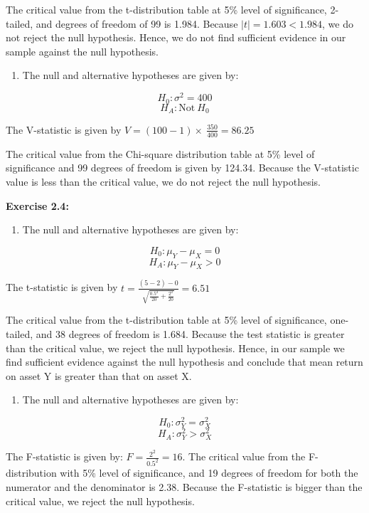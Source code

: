 \documentclass[
]{book}
\providecommand{\tightlist}{%
  \setlength{\itemsep}{0pt}\setlength{\parskip}{0pt}}
\theoremstyle{definition}
\theoremstyle{definition}
\theoremstyle{definition}
\theoremstyle{definition}
\theoremstyle{remark}
\begin{document}
The critical value from the t-distribution table at 5\% level of significance, 2-tailed, and degrees of freedom of 99 is 1.984. Because \(|t|=1.603<1.984\), we do not reject the null hypothesis. Hence, we do not find sufficient evidence in our sample against the null hypothesis.

\begin{enumerate}
\def\labelenumi{\alph{enumi}.}
\setcounter{enumi}{1}
\tightlist
\item
  The null and alternative hypotheses are given by:
\end{enumerate}

\[H_0: \sigma^2=400\]
\[H_A: \text{Not} \ H_0\]

The V-statistic is given by \(\displaystyle V= (100-1) \times \ \frac{350}{400}=86.25\)

The critical value from the Chi-square distribution table at 5\% level of significance and 99 degrees of freedom is given by 124.34. Because the V-statistic value is less than the critical value, we do not reject the null hypothesis.

\textbf{Exercise 2.4:}

\begin{enumerate}
\def\labelenumi{\alph{enumi}.}
\tightlist
\item
  The null and alternative hypotheses are given by:
\end{enumerate}

\[H_0: \mu_Y-\mu_X=0\]
\[H_A: \mu_Y-\mu_X>0\]

The t-statistic is given by \(\displaystyle t=\frac{(5-2)-0}{\sqrt{\frac{0.5^2}{20}+\frac{2^2}{20}}}=6.51\)

The critical value from the t-distribution table at 5\% level of significance, one-tailed, and 38 degrees of freedom is 1.684. Because the test statistic is greater than the critical value, we reject the null hypothesis. Hence, in our sample we find sufficient evidence against the null hypothesis and conclude that mean return on asset Y is greater than that on asset X.

\begin{enumerate}
\def\labelenumi{\alph{enumi}.}
\setcounter{enumi}{1}
\tightlist
\item
  The null and alternative hypotheses are given by:
\end{enumerate}

\[H_0: \sigma_Y^2=\sigma^2_X\]
\[H_A: \sigma_Y^2>\sigma^2_X\]

The F-statistic is given by: \(\displaystyle F=\frac{2^2}{0.5^2}=16\). The critical value from the F-distribution with 5\% level of significance, and 19 degrees of freedom for both the numerator and the denominator is 2.38. Because the F-statistic is bigger than the critical value, we reject the null hypothesis.
\end{document}
